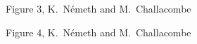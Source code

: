 \twolinestyle{\documentclass[prb,preprint]{revtex4}}
\begin{document}
{\begin{center}
Figure 3, K.~N\'emeth and M.~Challacombe \\[1.cm]
\end{center}

\clearpage

\begin{center}
Figure 4, K.~N\'emeth and M.~Challacombe \\[1.cm]
\end{center}

}
\end{document}
